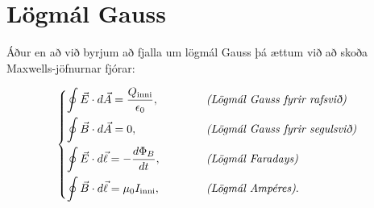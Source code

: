 
\chapter{Lögmál Gauss}

Áður en að við byrjum að fjalla um lögmál Gauss þá ættum við að skoða Maxwells-jöfnurnar fjórar:

\begin{align*}
    \begin{dcases*}
     \oint \Vec{E} \cdot d\Vec{A} = \frac{Q_{\text{inni}}}{\epsilon_0}, & \hspace{1cm} \emph{(Lögmál Gauss fyrir rafsvið)} \\
     \oint \Vec{B} \cdot d\Vec{A} = 0, & \hspace{1cm} \emph{(Lögmál Gauss fyrir segulsvið)} \\ 
     \oint \vec{E} \cdot d\vec{\ell} = - \frac{d\Phi_B}{dt}, & \hspace{1cm} \emph{(Lögmál Faradays)} \\
     \oint \vec{B} \cdot d \vec{\ell} = \mu_0 I_{\text{inni}}, & \hspace{1cm} \emph{(Lögmál Ampéres)}.
    \end{dcases*}
\end{align*}

